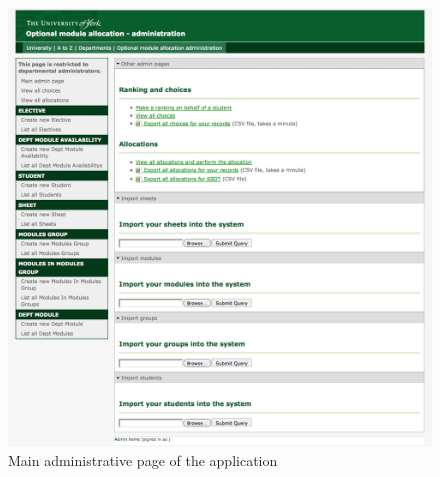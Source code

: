 \begin{landscape}
  \begin{figure}
    \begin{minipage}{0.5\linewidth}
      \centering
      \includegraphics[width=\linewidth]{images/walkthrough/admin_main.png}
      \caption{Main administrative page of the application}
      \label{walkthrough_admin_main}
    \end{minipage}
    \hspace{0.5cm}
    \begin{minipage}{0.5\linewidth}
      \centering

\end{minipage}
\end{figure}
\end{landscape}
